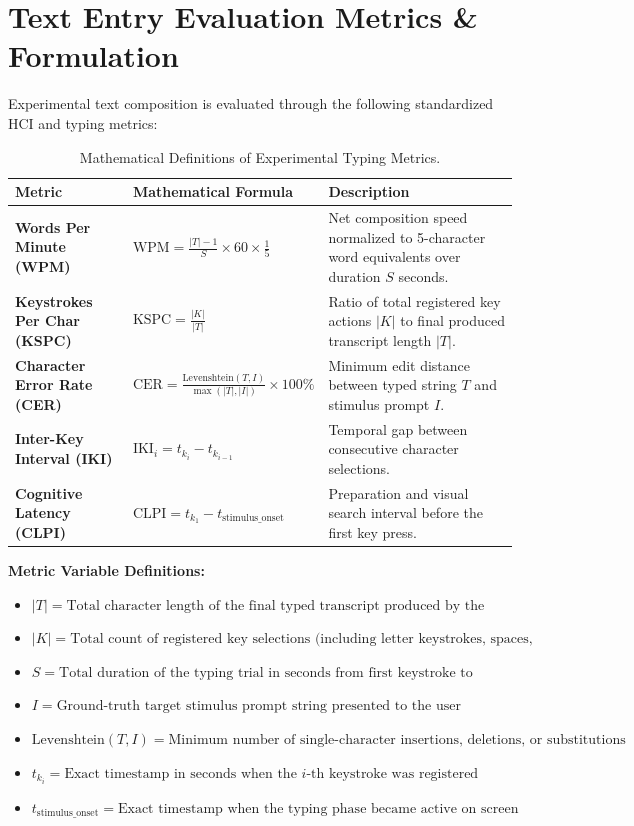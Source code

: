\documentclass[11pt,a4paper]{article}
\begin{document}
\section{Text Entry Evaluation Metrics \& Formulation}

Experimental text composition is evaluated through the following standardized HCI and typing metrics:

\begin{table}[H]
\centering
\caption{Mathematical Definitions of Experimental Typing Metrics.}
\small
\begin{tabularx}{\textwidth}{p{} p{} X}
\toprule
\textbf{Metric} & \textbf{Mathematical Formula} & \textbf{Description} \\
\midrule
\textbf{Words Per Minute (WPM)} & $\text{WPM} = \frac{|T| - 1}{S} \times 60 \times \frac{1}{5}$ & Net composition speed normalized to 5-character word equivalents over duration $S$ seconds. \\
\textbf{Keystrokes Per Char (KSPC)} & $\text{KSPC} = \frac{|K|}{|T|}$ & Ratio of total registered key actions $|K|$ to final produced transcript length $|T|$. \\
\textbf{Character Error Rate (CER)} & $\text{CER} = \frac{\text{Levenshtein}(T, I)}{\max(|T|, |I|)} \times 100\%$ & Minimum edit distance between typed string $T$ and stimulus prompt $I$. \\
\textbf{Inter-Key Interval (IKI)} & $\text{IKI}_i = t_{k_i} - t_{k_{i-1}}$ & Temporal gap between consecutive character selections. \\
\textbf{Cognitive Latency (CLPI)} & $\text{CLPI} = t_{k_1} - t_{\text{stimulus\_onset}}$ & Preparation and visual search interval before the first key press. \\
\bottomrule
\end{tabularx}
\end{table}

\textbf{Metric Variable Definitions:}
\begin{itemize}
    \item $|T| = \text{Total character length of the final typed transcript produced by the participant}$
    \item $|K| = \text{Total count of registered key selections (including letter keystrokes, spaces, and backspaces)}$
    \item $S = \text{Total duration of the typing trial in seconds from first keystroke to submission}$
    \item $I = \text{Ground-truth target stimulus prompt string presented to the user}$
    \item $\text{Levenshtein}(T, I) = \text{Minimum number of single-character insertions, deletions, or substitutions required}$
    \item $t_{k_i} = \text{Exact timestamp in seconds when the } i\text{-th keystroke was registered}$
    \item $t_{\text{stimulus\_onset}} = \text{Exact timestamp when the typing phase became active on screen}$
\end{itemize}
\end{document}
